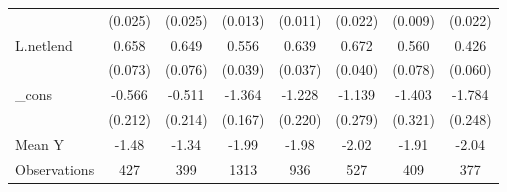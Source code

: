 {\begin{tabular}{l*{7}{c}}
            &     (0.025)         &     (0.025)         &     (0.013)         &     (0.011)         &     (0.022)         &     (0.009)         &     (0.022)         \\
\addlinespace
L.netlend   &       0.658\sym{***}&       0.649\sym{***}&       0.556\sym{***}&       0.639\sym{***}&       0.672\sym{***}&       0.560\sym{***}&       0.426\sym{***}\\
            &     (0.073)         &     (0.076)         &     (0.039)         &     (0.037)         &     (0.040)         &     (0.078)         &     (0.060)         \\
\addlinespace
\_cons      &      -0.566\sym{**} &      -0.511\sym{**} &      -1.364\sym{***}&      -1.228\sym{***}&      -1.139\sym{***}&      -1.403\sym{***}&      -1.784\sym{***}\\
            &     (0.212)         &     (0.214)         &     (0.167)         &     (0.220)         &     (0.279)         &     (0.321)         &     (0.248)         \\
\midrule
Mean Y      &       -1.48         &       -1.34         &       -1.99         &       -1.98         &       -2.02         &       -1.91         &       -2.04         \\
Observations&         427         &         399         &        1313         &         936         &         527         &         409         &         377         \\
\bottomrule
\end{tabular}
}
